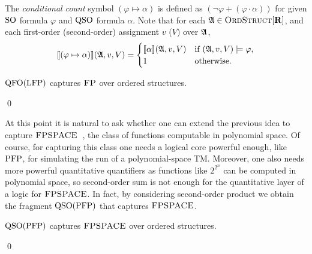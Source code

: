 The {\em conditional count} symbol $(\varphi \mapsto \alpha)$ is defined as $(\neg\varphi + (\varphi\cdot\alpha))$ for given ${\rm SO}$ formula $\varphi$ and ${\rm QSO}$ formula $\alpha$. Note that for each $\mathfrak{A} \in \text{\sc OrdStruct}[\mathbf{R}]$, and each first-order (second-order) assignment $v$ ($V$) over $\mathfrak{A}$,
\[
{\llbracket{}{(\varphi \mapsto \alpha)}\rrbracket}(\mathfrak{A},v,V) = 
\begin{cases}
{\llbracket{}{\alpha}\rrbracket}(\mathfrak{A},v,V) &\text{if } (\mathfrak{A},v,V)\models\varphi,\\
1 &\text{otherwise}.
\end{cases}
\]
\begin{thm} \label{theo:capture-fp}
	${\rm QFO}({\rm LFP})$ captures $\text{\sc FP}$ over ordered structures.
\end{thm}
\proof

\qed

At this point it is natural to ask whether one can extend the previous idea to capture $\text{\sc FPSPACE}$~\cite{Ladner89}, the class of functions computable in polynomial space. 
Of course, for capturing this class one needs a logical core powerful enough, like ${\rm PFP}$, for simulating the run of a polynomial-space TM.
Moreover, 
one also needs more powerful quantitative quantifiers as functions like $2^{2^n}$ can be computed in polynomial space,
so second-order sum is not enough for the quantitative layer of a logic for $\text{\sc FPSPACE}$.
In fact, by considering second-order product we obtain the fragment ${\rm QSO}({\rm PFP})$ that captures $\text{\sc FPSPACE}$. 
\begin{thm} \label{theo:capture-fpspace}
	${\rm QSO}({\rm PFP})$ captures $\text{\sc FPSPACE}$ over ordered structures.
\end{thm}
\proof

\qed

